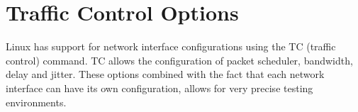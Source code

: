 \documentclass[a4paper,english, 12pt]{report}
\begin{document}
\section{Traffic Control Options}
Linux has support for network interface configurations using the TC (traffic control) command. TC allows the configuration of packet scheduler, bandwidth, delay and jitter. These options combined with the fact that each network interface can have its own configuration, allows for very precise testing environments.\\
%
%
%
\end{document}
